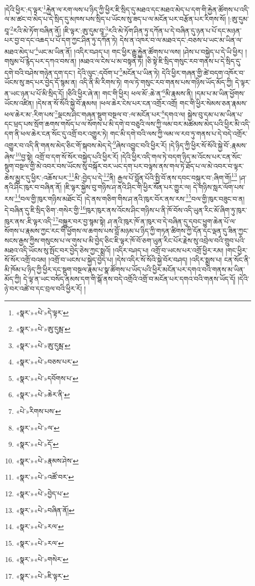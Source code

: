 །དེའི་ཕྱིར་:ད་ལྟར་\footnote{«སྣར་»«པེ་»དེ་ལྟར་}རྐྱེན་ལ་རག་ལས་པ་ཉིད་ཀྱི་ཕྱིར་ཇི་སྲིད་དུ་མཐའ་དང་མཐའ་མེད་པ་དག་གི་རྐྱེན་ཚོགས་པ་འདི་ལ་མ་ཚང་བ་མེད་པ་དེ་སྲིད་དུ་མཁས་པས་སྲིད་པ་ཡོངས་སུ་ཟད་པ་ལ་མངོན་པར་བརྩོན་པར་རིགས་སོ། །:ཨུ་དུམ་བཱ་\footnote{«སྣར་»«པེ་»ཨུ་དུམྦ་}རའི་མེ་ཏོག་བཞིན་ནོ། །ཇི་ལྟར་:ཨུ་དུམ་བཱ་\footnote{«སྣར་»«པེ་»ཨུ་དུམྦ་}རའི་མེ་ཏོག་ཤིན་ཏུ་དཀོན་པ་དེ་བཞིན་དུ་ཉན་པ་པོ་དང་མཉན་པར་བྱ་བ་དང་འཆད་པ་པོ་དག་ཀྱང་ཤིན་ཏུ་དཀོན་ཏེ། དེས་ན་འཁར་བ་ལ་མཐའ་དང་:བཅས་པ་ཡང་མ་ཡིན་ལ་མཐའ་མེད་པ་\footnote{«སྣར་»«པེ་»བཅས་པར་}ཡང་མ་ཡིན་ནོ། །འདིར་བཤད་པ། གང་ཕྱིར་རྒྱུ་རྐྱེན་ཚོགས་པ་ལས། །ཤེས་པ་བསྐྱེད་པ་དེ་ཡི་ཕྱིར། །གསུམ་པོ་རྙེད་པར་དཀའ་བས་ན། །མཐའ་ལ་ངེས་པ་མ་བསྟན་ཏོ། །ཅི་སྟེ་ཇི་སྲིད་གསུང་རབ་གནས་པ་དེ་སྲིད་དུ་དགེ་བའི་བཤེས་གཉེན་དག་དང་། དེའི་ལུང་:དབོག་པ་\footnote{«སྣར་»«པེ་»དབོགས་པ་}མངོན་པ་ཡིན་ཏེ། དེའི་ཕྱིར་གཞན་གྱི་ཚེ་བདག་འཁོར་བ་ཡོངས་སུ་ཟད་པར་བྱེད་དོ་སྙམ་ན། འདི་ནི་མི་རིགས་ཏེ། གལ་ཏེ་གསུང་རབ་གནས་པས་གཉིས་ཡོད་མོད་ཀྱི། དེ་ལྟར་ན་ཡང་ཉན་པ་པོ་མི་སྲིད་དོ། །ཅིའི་ཕྱིར་ཞེ་ན། གང་གི་ཕྱིར། ཕལ་མོ་:ཆེ་ན་\footnote{«སྣར་»«པེ་»ཆེར་ནི་}མི་རྣམས་ནི། །དམ་པ་མ་ཡིན་ཕྱོགས་ཡོངས་འཛིན། །དེས་ན་སོ་སོའི་སྐྱེ་བོ་རྣམས། །ཕལ་ཆེར་ངེས་པར་ངན་འགྲོར་འགྲོ། གང་གི་ཕྱིར་སེམས་ཅན་རྣམས་ཕལ་ཆེར་མ་:རིག་པས་\footnote{«པེ་»རིགས་པས་}ལྡངས་ཤིང་གཞན་སྡུག་བསྔལ་བ་:ལ་མངོན་པར་\footnote{«སྣར་»«པེ་»ལ་}དགའ་ལ། སྐྱེས་བུ་དམ་པ་མ་ཡིན་པ་དང་ཕྲད་པས་སྲོག་ཆགས་གསོད་པ་ལ་སོགས་པ་མི་དགེ་བ་བཅུའི་ལས་ཀྱི་ལམ་བར་མཚམས་མེད་པའི་ཕྱིར་མི་འདི་དག་ནི་ཕལ་ཆེར་ངན་སོང་དུ་འགྲོ་བར་འགྱུར་ཏེ། གང་མི་དགེ་བའི་ལས་ཀྱི་ལམ་ལ་རབ་ཏུ་གནས་པ་དེ་བདེ་འགྲོར་འགྱུར་བ་འདི་ནི་གནས་མེད་ཅིང་གོ་སྐབས་མེད་དེ་\footnote{«སྣར་»«པེ་»དོ་}ཞེས་འབྱུང་བའི་ཕྱིར་རོ། །དེ་ཉིད་ཀྱི་ཕྱིར་སོ་སོའི་སྐྱེ་བོ་:རྣམས་ཞེས་\footnote{«སྣར་»«པེ་»རྣམས་ཤེས་}བྱ་སྟེ། འགྲོ་བ་དག་སོ་སོར་བསྐྱེད་པའི་ཕྱིར་རོ། །དེའི་ཕྱིར་འདི་གལ་ཏེ་བདག་ཉིད་མ་འོངས་པར་ངན་སོང་སྡུག་བསྔལ་གྱི་མེ་འབར་བས་ཡོངས་སུ་བསྐོར་བར་ཡང་དག་པར་བལྟས་ནས་གལ་ཏེ་ཐོད་པ་ལ་མེ་འབར་བ་ལྟར་ཆེས་མྱུར་དུ་ཕྱིར་:འཆོས་པར་\footnote{«སྣར་»«པེ་»འཚོ་བར་}མི་:བྱེད་པ་དེ་\footnote{«སྣར་»«པེ་»བྱེད་པ་}ནི། རྒྱལ་པོ་བློན་པོའི་སྤྱི་བོ་ནས་དབང་བསྐུར་བ་:ཞིག་གོ།\footnote{«སྣར་»«པེ་»བཞིན་ནོ།} །ཤ་ནའི་ཤིང་ཁུར་བ་བཞིན་ནོ། །ཇི་ལྟར་སྐྱེས་བུ་གཉིས་ཤ་ནའི་ཤིང་གི་ཕྱིར་སོན་པར་གྱུར་ལ། དེ་གཉིས་སླར་ལོག་པས་རས་\footnote{«སྣར་»«པེ་»རལ་}བལ་གྱི་ཁུར་གཉིས་མཐོང་ངོ། །དེ་ནས་གཅིག་གིས་ཤ་ནའི་ཁུར་བོར་ནས་རས་\footnote{«སྣར་»«པེ་»རལ་}བལ་གྱི་ཁུར་བཟུང་བ་ན། དེ་བཞིན་དུ་ཇི་སྲིད་ཅིག་:གསེར་གྱི་\footnote{«སྣར་»«པེ་»གསེར་}ཁུར་ཁུར་ནས་འོངས་ཤིང་གཉིས་པ་ནི་ཁོ་བོས་འདི་ཡུན་རིང་མོ་ཞིག་ཏུ་ཁུར་ཁུར་ནས་:ཇི་ལྟར་འདི་\footnote{«སྣར་»«པེ་»ཇི་ལྟར་}བསྐྱུར་བར་བྱ་སྙམ་སྟེ། ཤ་ནའི་ཁུར་ཁོ་ན་ཁུར་བ་དེ་བཞིན་དུ་དབང་ཕྱུག་ཆེན་པོ་ལ་སོགས་པ་རྣམས་ཀྱང་རང་གི་ཕྱོགས་ལ་ཆགས་པས་བློ་མཉམ་པ་ཉིད་ཀྱི་གཏན་ཚིགས་ཀྱི་དོན་དང་ལྡན་དུ་ཟིན་ཀྱང་སངས་རྒྱས་ཀྱིས་གསུངས་པ་ལ་གུས་པ་མི་བྱེད་ཅིང་ཇི་ལྟར་ཁོ་བོ་ཅག་ཡུན་རིང་པོར་རྗེས་སུ་འབྲེལ་བའི་གྲུབ་པའི་མཐའ་འདི་ཡོངས་སུ་སྤོང་བར་བྱེད་ཅེས་ཀྱང་སྨྲའོ། །འདིར་བཤད་པ། འགྲོ་བ་ཡངས་པར་འགྲོ་ཕྱིར་རམ། །གང་ཕྱིར་སོ་སོར་འགྲོ་བའམ། །འགྲོ་བ་ཡངས་པ་སྐྱེད་བྱེད་པ། །དེས་འདིར་སོ་སོའི་སྐྱེ་བོར་བཤད། །འདིར་སྨྲས་པ། ངན་སོང་ནི་མི་ཁོམ་པ་ཉིད་ཀྱི་ཕྱིར་དང་སྡུག་བསྔལ་རྣམ་པ་སྣ་ཚོགས་པ་ཡོད་པའི་ཕྱིར་མངོན་པར་དགའ་བའི་གནས་མ་ཡིན་མོད་ཀྱི། དེ་ལྟ་ན་ཡང་བསོད་ནམས་དག་གི་སྒོ་ནས་བདེ་འགྲོའི་འགྲོ་བ་མངོན་པར་དགའ་བའི་གནས་ཡོད་དོ། །དེའི་ཉེ་བར་འཚེ་བ་དང་བྲལ་བའི་ཕྱིར་རོ། །
